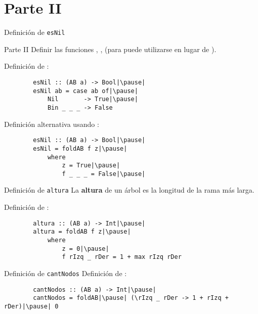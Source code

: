 \section{Parte II}

\begin{frame}[fragile]{Definición de \texttt{esNil}}
    \begin{exampleblock}{Parte II}
        Definir las funciones , ,  (para  puede utilizarse  en lugar de ).
    \end{exampleblock}

    \pause

    Definición de :

    \pause

    \begin{verbatim}
        esNil :: (AB a) -> Bool|\pause|
        esNil ab = case ab of|\pause|
            Nil       -> True|\pause|
            Bin _ _ _ -> False
    \end{verbatim}

    \pause

    Definición alternativa usando :
    \begin{verbatim}
        esNil :: (AB a) -> Bool|\pause|
        esNil = foldAB f z|\pause|
            where
                z = True|\pause|
                f _ _ _ = False|\pause|
    \end{verbatim}
\end{frame}

\begin{frame}[fragile]{Definición de \texttt{altura}}
    La \textbf{altura} de un árbol es la longitud de la rama más larga.

    \pause

    Definición de :

    \begin{verbatim}
        altura :: (AB a) -> Int|\pause|
        altura = foldAB f z|\pause|
            where
                z = 0|\pause|
                f rIzq _ rDer = 1 + max rIzq rDer
    \end{verbatim}
\end{frame}

\begin{frame}[fragile]{Definición de \texttt{cantNodos}}
    Definición de :

    \pause

    \begin{verbatim}
        cantNodos :: (AB a) -> Int|\pause|
        cantNodos = foldAB|\pause| (\rIzq _ rDer -> 1 + rIzq + rDer)|\pause| 0
    \end{verbatim}
\end{frame}
